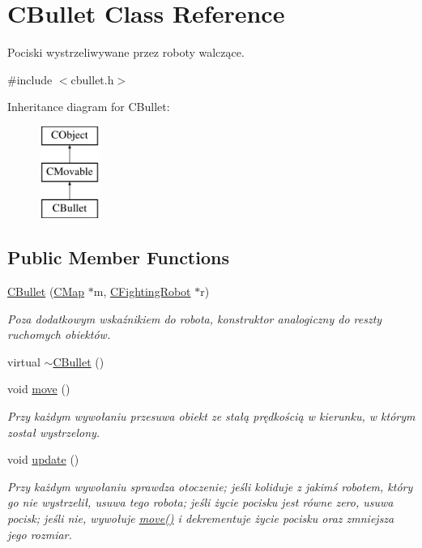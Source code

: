 \hypertarget{class_c_bullet}{}\section{C\+Bullet Class Reference}
\label{class_c_bullet}


Pociski wystrzeliwywane przez roboty walczące.  




{\ttfamily \#include $<$cbullet.\+h$>$}

Inheritance diagram for C\+Bullet\+:\begin{figure}[H]
\begin{center}
\leavevmode
\includegraphics[height=3.000000cm]{class_c_bullet}
\end{center}
\end{figure}
\subsection*{Public Member Functions}
\begin{DoxyCompactItemize}
\item 
\mbox{\hyperlink{class_c_bullet_a56797cd539f173bbfc8cc9d238734fbc}{C\+Bullet}} (\mbox{\hyperlink{class_c_map}{C\+Map}} $\ast$m, \mbox{\hyperlink{class_c_fighting_robot}{C\+Fighting\+Robot}} $\ast$r)
\begin{DoxyCompactList}\small\item\em Poza dodatkowym wskaźnikiem do robota, konstruktor analogiczny do reszty ruchomych obiektów. \end{DoxyCompactList}\item 
virtual \mbox{\hyperlink{class_c_bullet_ac3502e35a7797b9d7d0efef288618a71}{$\sim$\+C\+Bullet}} ()
\item 
void \mbox{\hyperlink{class_c_bullet_a693e95f219a9a642e3977bb48be0cf5d}{move}} ()
\begin{DoxyCompactList}\small\item\em Przy każdym wywołaniu przesuwa obiekt ze stałą prędkością w kierunku, w którym został wystrzelony. \end{DoxyCompactList}\item 
void \mbox{\hyperlink{class_c_bullet_a9685917f7fc76d417e03744223b1b2c6}{update}} ()
\begin{DoxyCompactList}\small\item\em Przy każdym wywołaniu sprawdza otoczenie; jeśli koliduje z jakimś robotem, który go nie wystrzelił, usuwa tego robota; jeśli życie pocisku jest równe zero, usuwa pocisk; jeśli nie, wywołuje \mbox{\hyperlink{class_c_bullet_a693e95f219a9a642e3977bb48be0cf5d}{move()}} i dekrementuje życie pocisku oraz zmniejsza jego rozmiar. \end{DoxyCompactList}\end{DoxyCompactItemize}
